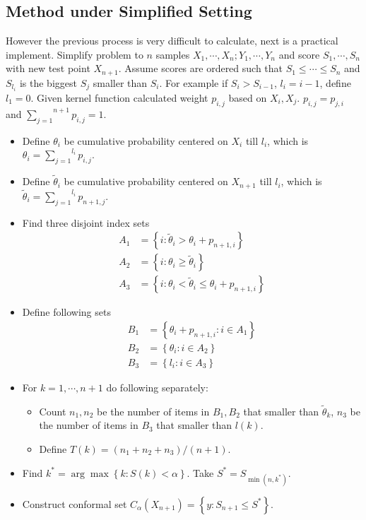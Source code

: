 \documentclass[12pt, a4paper, oneside]{article}
\begin{document}
\subsection{Method under Simplified Setting}
    However the previous process is very difficult to calculate, next is a practical implement. Simplify problem to $n$ samples $X_1,\cdots,X_n;Y_1,\cdots,Y_n$ and score $S_1,\cdots,S_n$ with new test point $X_{n+1}$. Assume scores are ordered such that $S_1\leq\cdots\leq S_n$ and $S_{l_i}$ is the biggest $S_j$ smaller than $S_i$. For example if $S_i>S_{i-1}$, $l_i=i-1$, define $l_1=0$. Given kernel function calculated weight $p_{i,j}$ based on $X_i,X_j$. $p_{i,j}=p_{j,i}$ and $\overset{n+1}{\underset{j=1}\sum}p_{i,j}=1$.
    \begin{itemize}
        \item Define $\theta_i$ be cumulative probability centered on $X_i$ till $l_i$, which is $\theta_i=\overset{l_i}{\underset{j=1}\sum}p_{i,j}$.
        \item Define $\tilde{\theta}_i$ be cumulative probability centered on $X_{n+1}$ till $l_i$, which is $\tilde{\theta}_i=\overset{l_i}{\underset{j=1}\sum}p_{n+1,j}$.
        \item Find three disjoint index sets
        \begin{align*}
            A_1&=\left\{ i:\tilde{\theta}_i>\theta_i+p_{n+1,i} \right\}\\
            A_2&=\left\{ i:\theta_i\geq\tilde{\theta}_i \right\}\\
            A_3&=\left\{ i:\theta_i<\tilde{\theta}_i\leq\theta_i+p_{n+1,i} \right\}
        \end{align*}
        \item Define following sets
        \begin{align*}
            B_1&=\left\{ \theta_i+p_{n+1,i}:i\in A_1 \right\}\\
            B_2&=\left\{ \theta_i:i\in A_2 \right\}\\
            B_3&=\left\{ l_i:i\in A_3 \right\}
        \end{align*}
        \item For $k=1,\cdots,n+1$ do following separately:
        \begin{itemize}
            \item Count $n_1,n_2$ be the number of items in $B_1,B_2$ that smaller than $\tilde{\theta}_k$, $n_3$ be the number of items in $B_3$ that smaller than $l(k)$.
            \item Define $T(k)=(n_1+n_2+n_3)/(n+1)$.
        \end{itemize}
        \item Find $k^*=\arg\max\left\{ k:S(k)<\alpha \right\}$. Take $S^*=S_{\min(n,k^*)}$.
        \item Construct conformal set $C_\alpha(X_{n+1})=\left\{ y:S_{n+1}\leq S^* \right\}$.
    \end{itemize}
\end{document}

